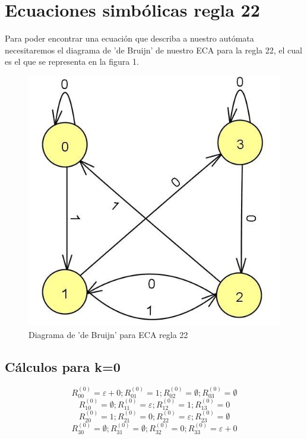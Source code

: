 \documentclass[11pt]{article}
\begin{document}
	\section{Ecuaciones simbólicas regla 22}
	Para poder encontrar una ecuación que describa a nuestro autómata necesitaremos el diagrama de 'de Bruijn' de nuestro ECA para la regla 22, el cual es el que se representa en la figura 1.
	\begin{figure}[H]
			\centering
			\includegraphics[scale=0.5]{resources/rule22f.jpg}
			\caption{Diagrama de 'de Bruijn' para ECA regla 22}\label{fig:picture}
	\end{figure}
		\subsection{Cálculos para k=0}
			\[R_{00}^{(0)}=\varepsilon+0; R_{01}^{(0)}=1; R_{02}^{(0)}=\emptyset;
			  R_{03}^{(0)}=\emptyset\]
			\[R_{10}^{(0)}=\emptyset; R_{11}^{(0)}=\varepsilon; R_{12}^{(0)}=1;
			  R_{13}^{(0)}=0\]
			\[R_{20}^{(0)}=1; R_{21}^{(0)}=0; R_{22}^{(0)}=\varepsilon;
			  R_{23}^{(0)}=\emptyset\]
			\[R_{30}^{(0)}=\emptyset; R_{31}^{(0)}=\emptyset; R_{32}^{(0)}=0;
			  R_{33}^{(0)}=\varepsilon+0\]
\end{document}
